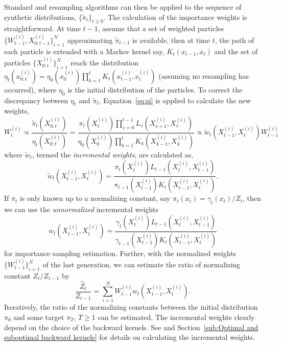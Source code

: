 Standard \sis and resampling algorithms can then be applied to the sequence of synthetic distributions, $\{\tilde\pi_t\}_{t\ge0}$. The calculation of the importance weights is straightforward. At time $t-1$, assume that a set of weighted particles $\{W_{t-1}^{(i)},X_{0:t-1}^{(i)}\}_{i=1}^N$ approximating $\tilde\pi_{t-1}$ is available, then at time $t$, the path of each particle is extended with a Markov kernel say, $K_t(x_{t-1}, x_t)$ and the set of particles $\{X_{0:t}^{(i)}\}_{i=1}^N$ reach the distribution $\eta_t(x_{0:t}^{(i)}) = \eta_0(x_0^{(i)})\prod_{k=1}^tK_t(x_{t-1}^{(i)}, x_t^{(i)})$ (assuming no resampling has occurred), where $\eta_0$ is the initial distribution of the particles. To correct the discrepancy between $\eta_t$ and $\tilde\pi_t$, Equation~\eqref{eq:si} is applied to calculate the new weights,
\begin{equation}
  W_t^{(i)} \propto \frac{\tilde\pi_t(X_{0:t}^{(i)})}{\eta_t(X_{0:t}^{(i)})}
  = \frac{\pi_t(X_t^{(i)})\prod_{s=0}^{t-1}L_s(X_{s+1}^{(i)}, X_s^{(i)})}
  {\eta_0(X_0^{(i)})\prod_{k=1}^tK_k(X_{k-1}^{(i)},X_k^{(i)})}
  \propto \tilde{w}_t(X_{t-1}^{(i)}, X_t^{(i)})W_{t-1}^{(i)}
\end{equation}
where $\tilde{w}_t$, termed the \emph{incremental weights}, are calculated as,
\begin{equation}
  \tilde{w}_t(X_{t-1}^{(i)},X_t^{(i)}) =
  \frac{\pi_t(X_t^{(i)})L_{t-1}(X_t^{(i)}, X_{t-1}^{(i)})}
  {\pi_{t-1}(X_{t-1}^{(i)})K_t(X_{t-1}^{(i)}, X_t^{(i)})}.
\end{equation}
If $\pi_t$ is only known up to a normalizing constant, say $\pi_t(x_t) = \gamma_t(x_t)/Z_t$, then we can use the \emph{unnormalized} incremental weights
\begin{equation}
  w_t(X_{t-1}^{(i)},X_t^{(i)}) =
  \frac{\gamma_t(X_t^{(i)})L_{t-1}(X_t^{(i)}, X_{t-1}^{(i)})}
  {\gamma_{t-1}(X_{t-1}^{(i)})K_t(X_{t-1}^{(i)}, X_t^{(i)})}
\end{equation}
for importance sampling estimation. Further, with the normalized weights $\{W_{t-1}^{(i)}\}_{i=1}^N$ of the last generation, we can estimate the ratio of normalizing constant $Z_t/Z_{t-1}$ by
\begin{equation}
  \frac{\hat{Z}_t}{Z_{t-1}} =
  \sum_{i=1}^N W_{t-1}^{(i)}w_t(X_{t-1}^{(i)},X_t^{(i)}).
  \label{eq:ratio normalized}
\end{equation}
Iteratively, the ratio of the normalizing constants between the initial distribution $\pi_0$ and some target $\pi_T$, $T\ge1$ can be estimated. The incremental weights clearly depend on the choice of the backward kernels. See \cite{DelMoral:2006hc} and Section~\ref{sub:Optimal and suboptimal backward kernels} for details on calculating the incremental weights.

